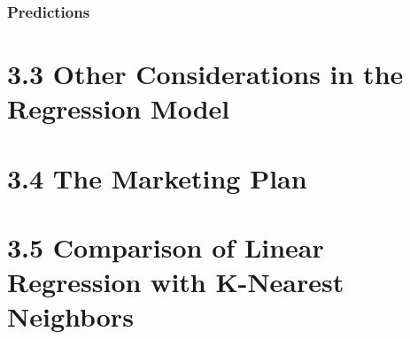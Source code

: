          \subsubsection*{Predictions}
        
        \section*{3.3 Other Considerations in the Regression Model}\label{other-considerations-in-the-regression-model}
        
        \section*{3.4 The Marketing Plan}\label{the-marketing-plan}
        
        \section*{3.5 Comparison of Linear Regression with K-Nearest Neighbors}\label{comparison-of-linear-regression-with-k-nearest-neighbors}
        
    
